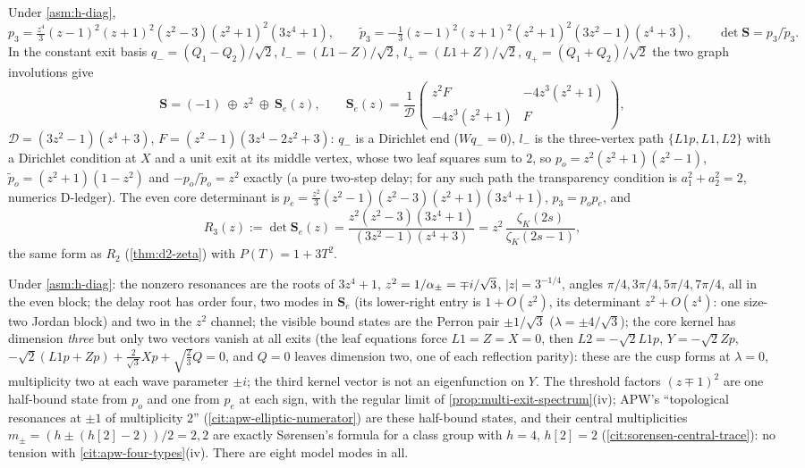 \begin{theorem}
\label{thm:d3-channels}
Under \cref{asm:h-diag},
\[
p_3 = \tfrac{z^4}{3}(z-1)^2(z+1)^2(z^2-3)(z^2+1)^2(3z^4+1),\qquad
\tilde p_3 = -\tfrac13(z-1)^2(z+1)^2(z^2+1)^2(3z^2-1)(z^4+3),\qquad \det\mathbf S = p_3/\tilde p_3 .
\]
In the constant exit basis $q_- = (Q_1-Q_2)/\sqrt2$, $l_- = (L1-Z)/\sqrt2$, $l_+ = (L1+Z)/\sqrt2$,
$q_+ = (Q_1+Q_2)/\sqrt2$ the two graph involutions give
\[
\mathbf S = (-1)\ \oplus\ z^2\ \oplus\ \mathbf S_e(z),\qquad
\mathbf S_e(z) = \frac1{\mathcal D}\begin{pmatrix} z^2F & -4z^3(z^2+1)\\ -4z^3(z^2+1) & F\end{pmatrix},
\]
$\mathcal D = (3z^2-1)(z^4+3)$, $F = (z^2-1)(3z^4-2z^2+3)$: $q_-$ is a Dirichlet end ($Wq_- = 0$), $l_-$ is the
three-vertex path $\{L1p,L1,L2\}$ with a Dirichlet condition at $X$ and a unit exit at its middle vertex,
whose two leaf squares sum to $2$, so $p_o = z^2(z^2+1)(z^2-1)$, $\tilde p_o = (z^2+1)(1-z^2)$ and
$-p_o/\tilde p_o = z^2$ exactly (a pure two-step delay; for any such path the transparency condition is
$a_1^2+a_2^2 = 2$, numerics D-ledger). The even core determinant is $p_e = \frac{z^2}{3}(z^2-1)(z^2-3)(z^2+1)
(3z^4+1)$, $p_3 = p_op_e$, and
\[
R_3(z) := \det\mathbf S_e(z) = \frac{z^2(z^2-3)(3z^4+1)}{(3z^2-1)(z^4+3)} = z^2\,\frac{\zeta_K(2s)}{\zeta_K(2s-1)},
\]
the same form as $R_2$ (\cref{thm:d2-zeta}) with $P(T) = 1+3T^2$.
\end{theorem}

\begin{proposition}
\label{prop:d3-spectrum}
Under \cref{asm:h-diag}: the nonzero resonances are the roots of $3z^4+1$, $z^2 = 1/\alpha_{\pm} = \mp i/\sqrt3$,
$|z| = 3^{-1/4}$, angles $\pi/4,3\pi/4,5\pi/4,7\pi/4$, all in the even block; the delay root has order four,
two modes in $\mathbf S_e$ (its lower-right entry is $1+O(z^2)$, its determinant $z^2+O(z^4)$: one size-two
Jordan block) and two in the $z^2$ channel; the visible bound states are the Perron pair $\pm1/\sqrt3$
($\lambda = \pm4/\sqrt3$); the core kernel has dimension \emph{three} but only two vectors vanish at all exits
(the leaf equations force $L1 = Z = X = 0$, then $L2 = -\sqrt2L1p$, $Y = -\sqrt2Zp$, $-\sqrt2(L1p+Zp)+
\frac2{\sqrt3}Xp+\sqrt{\tfrac23}Q = 0$, and $Q = 0$ leaves dimension two, one of each reflection parity):
these are the cusp forms at $\lambda = 0$, multiplicity two at each wave parameter $\pm i$; the third kernel
vector is not an eigenfunction on $Y$. The threshold factors $(z\mp1)^2$ are one half-bound state from
$p_o$ and one from $p_e$ at each sign, with the regular limit of \cref{prop:multi-exit-spectrum}(iv); APW's
``topological resonances at $\pm1$ of multiplicity $2$'' (\cref{cit:apw-elliptic-numerator}) are these half-bound
states, and their central multiplicities $m_\pm = (h\pm(h[2]-2))/2 = 2,2$ are exactly Sørensen's formula
for a class group with $h = 4$, $h[2] = 2$ (\cref{cit:sorensen-central-trace}): no tension with
\cref{cit:apw-four-types}(iv). There are eight model modes in all.
\end{proposition}

